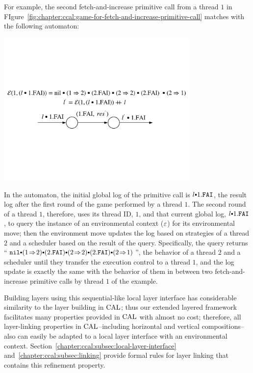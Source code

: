 For example, the second fetch-and-increase primitive call from a thread $1$ in FIgure~\ref{fig:chapter:ccal:game-for-fetch-and-increase-primitive-call}
matches with the following automaton:
\begin{center}
\includegraphics[width=0.75\textwidth]{figs/ccal/faiexamplewithcontext}
\end{center}
In the automaton, the initial global log of the primitive call is $l \cons 1.\incticket$,
the result log after the first round of the game performed by a thread $1$.
The second round of a thread $1$, therefore, uses its thread ID, $1$,  and that current global log, $l \cons 1.\incticket$, to query the instance of an environmental context (${\varepsilon}$) for its environmental move; then the environment move updates the log based on strategies of a thread $2$ and a scheduler based on the result of the query.
Specifically, the query returns ``$\nulllist \cons (1 \switch 2) \cons (2.\incticket) \cons (2 \switch 2) \cons (2.\incticket) \cons (2 \switch 1)$'',
the behavior of a thread $2$ and a scheduler until they transfer the execution control to a thread $1$,  and 
the log update is exactly the same with the behavior of them in between two fetch-and-increase primitive calls by thread $1$ of the example.

Building layers using this sequential-like local layer interface has considerable similarity to 
the layer building in $\mathrm{CAL}$; thus 
our extended layered framework facilitates
many properties provided in $\mathrm{CAL}$ with almost no cost;
therefore, all layer-linking properties in $\mathrm{CAL}$--including horizontal and vertical compositions--also can 
easily be adapted to a local layer interface with an environmental context.
Section~\ref{chapter:ccal:subsec:local-layer-interface}  and~\ref{chapter:ccal:subsec:linking} provide formal rules for layer linking that contains this refinement property.

